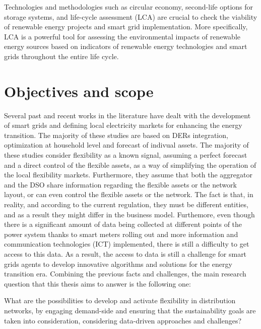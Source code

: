 Technologies and methodologies such as circular economy, second-life options for storage systems, and life-cycle assessment (LCA) are crucial to check the viability of renewable energy projects and smart grid implementation. More specifically, LCA is a powerful tool for assessing the environmental impacts of renewable energy sources based on indicators of renewable energy technologies and smart grids throughout the entire life cycle. 



\newpage 
\section{Objectives and scope}\label{sec:objectives}
Several past and recent works in the literature have dealt with the development of smart grids and defining local electricity markets for enhancing the energy transition. The majority of these studies are based on DERs integration, optimization at household level and forecast of indivual assets. The majority of these studies consider flexibility as a known signal, assuming a perfect forecast and a direct control of the flexible assets, as a way of simplifying the operation of the local flexibility markets. Furthermore, they assume that both the aggregator and the DSO share information regarding the flexible assets or the network layout, or can even control the flexible assets or the network. The fact is that, in reality, and according to the current regulation, they must be different entities, and as a result they might differ in the business model. Furthemore, even though there is a significant amount of data being collected at different points of the power system thanks to smart meters rolling out and more information and communication technologies (ICT) implemented, there is still a difficulty to get access to this data. As a result, the access to data is still a challenge for smart grids agents to develop innovative algorithms and solutions for the energy transition era. Combining the previous facts and challenges, the main research question that this thesis aims to answer is the following one:

\vspace*{1mm}
\begin{tcolorbox}
What are the possibilities to develop and activate flexibility in distribution networks, by engaging demand-side and ensuring that the sustainability goals are taken into consideration, considering data-driven approaches and challenges? 
\end{tcolorbox}


